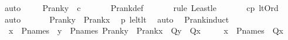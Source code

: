 \begin{isabellebody}
\ auto\ \isanewline
\ \ \isamarkupfalse%
\ {\isachardoublequoteopen}P{\isacharunderscore}{\kern0pt}rank{\isacharparenleft}{\kern0pt}y{\isacharparenright}{\kern0pt}\ {\isasymle}\ c{\isachardoublequoteclose}\ \isanewline
\ \ \ \ \isamarkupfalse%
\ P{\isacharunderscore}{\kern0pt}rank{\isacharunderscore}{\kern0pt}def\ \isanewline
\ \ \ \ \isamarkupfalse%
\ {\isacharparenleft}{\kern0pt}rule\ Least{\isacharunderscore}{\kern0pt}le{\isacharparenright}{\kern0pt}\ \isanewline
\ \ \ \ \isamarkupfalse%
\ cp\ lt{\isacharunderscore}{\kern0pt}Ord\ \isamarkupfalse%
\ auto\ \isanewline
\ \ \isamarkupfalse%
\ \isamarkupfalse%
\ {\isachardoublequoteopen}P{\isacharunderscore}{\kern0pt}rank{\isacharparenleft}{\kern0pt}y{\isacharparenright}{\kern0pt}\ {\isacharless}{\kern0pt}\ P{\isacharunderscore}{\kern0pt}rank{\isacharparenleft}{\kern0pt}x{\isacharparenright}{\kern0pt}{\isachardoublequoteclose}\ \isamarkupfalse%
\ p{}\ le{\isacharunderscore}{\kern0pt}lt{\isacharunderscore}{\kern0pt}lt\ \isamarkupfalse%
\ auto\ \isanewline
{}\isamarkupfalse%
%
\endisatagproof
{\isafoldproof}%
%
\isadelimproof
\isanewline
%
\endisadelimproof
\isanewline
{}\isamarkupfalse%
\ P{\isacharunderscore}{\kern0pt}rank{\isacharunderscore}{\kern0pt}induct\ {\isacharcolon}{\kern0pt}\ \isanewline
\ \ {\isachardoublequoteopen}{\isacharparenleft}{\kern0pt}{\isasymforall}x\ {\isasymin}\ P{\isacharunderscore}{\kern0pt}names{\isachardot}{\kern0pt}\ {\isacharparenleft}{\kern0pt}{\isacharparenleft}{\kern0pt}{\isasymforall}\ y\ {\isasymin}\ P{\isacharunderscore}{\kern0pt}names{\isachardot}{\kern0pt}\ P{\isacharunderscore}{\kern0pt}rank{\isacharparenleft}{\kern0pt}y{\isacharparenright}{\kern0pt}\ {\isacharless}{\kern0pt}\ P{\isacharunderscore}{\kern0pt}rank{\isacharparenleft}{\kern0pt}x{\isacharparenright}{\kern0pt}\ {\isasymlongrightarrow}\ Q{\isacharparenleft}{\kern0pt}y{\isacharparenright}{\kern0pt}{\isacharparenright}{\kern0pt}\ {\isasymlongrightarrow}\ Q{\isacharparenleft}{\kern0pt}x{\isacharparenright}{\kern0pt}{\isacharparenright}{\kern0pt}{\isacharparenright}{\kern0pt}\isanewline
\ \ \ \ {\isasymLongrightarrow}\ x\ {\isasymin}\ P{\isacharunderscore}{\kern0pt}names\ {\isasymLongrightarrow}\ Q{\isacharparenleft}{\kern0pt}x{\isacharparenright}{\kern0pt}{\isachardoublequoteclose}\ \isanewline
%
\isadelimproof
%
\endisadelimproof
%
\isatagproof
{}\isamarkupfalse%
\ {\isacharminus}{\kern0pt}\ \isanewline

\end{isabellebody}
